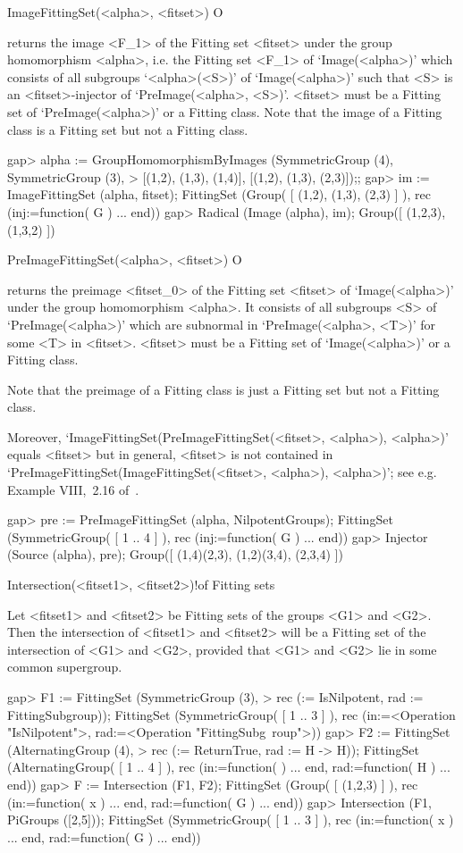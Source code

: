 \>ImageFittingSet(<alpha>, <fitset>) O

returns the image <F_1> of the Fitting set <fitset> under the group homomorphism 
<alpha>, i.e.
the Fitting set <F_1> of `Image(<alpha>)' which consists of all subgroups
`<alpha>(<S>)' of `Image(<alpha>)' such that <S> is an <fitset>-injector of 
`PreImage(<alpha>, <S>)'. <fitset> must be a Fitting set of `PreImage(<alpha>)'
or a Fitting class.  Note that the image of a Fitting class is a
Fitting set but not a Fitting class.

\beginexample
gap> alpha := GroupHomomorphismByImages (SymmetricGroup (4), SymmetricGroup (3),
>  [(1,2), (1,3), (1,4)], [(1,2), (1,3), (2,3)]);;
gap> im := ImageFittingSet (alpha, fitset);
FittingSet (Group( [ (1,2), (1,3), (2,3) 
 ] ), rec (inj:=function( G ) ... end))
gap> Radical (Image (alpha), im);
Group([ (1,2,3), (1,3,2) ])
\endexample

\>PreImageFittingSet(<alpha>, <fitset>) O

returns the preimage <fitset_0> of the Fitting set <fitset> of `Image(<alpha>)' under the group homomorphism <alpha>. It consists of all
subgroups <S> of `PreImage(<alpha>)' which are subnormal in `PreImage(<alpha>, <T>)' for some <T> in <fitset>. <fitset> must be a Fitting set of
`Image(<alpha>)' or a Fitting class. 

Note that the preimage of a Fitting class is just a Fitting set but 
not a Fitting class.

Moreover, `ImageFittingSet(PreImageFittingSet(<fitset>, <alpha>),
<alpha>)' equals <fitset> but in general, <fitset> is not contained in
`PreImageFittingSet(ImageFittingSet(<fitset>, <alpha>), <alpha>)'; see
e.g. Example VIII,~2.16 of~\cite{DH1992}.

\beginexample
gap> pre := PreImageFittingSet (alpha, NilpotentGroups);
FittingSet (SymmetricGroup( [ 1 .. 4 ] ), rec (inj:=function( G ) ... end))
gap> Injector (Source (alpha), pre);
Group([ (1,4)(2,3), (1,2)(3,4), (2,3,4) ])
\endexample

\>Intersection(<fitset1>, <fitset2>)!{of Fitting sets}

Let <fitset1> and <fitset2> be Fitting sets of the groups <G1> and <G2>. 
Then the intersection of <fitset1> and <fitset2> will be a Fitting set of the 
intersection of <G1> and <G2>, provided that <G1> and <G2> lie in some 
common supergroup.

\beginexample
gap> F1 := FittingSet (SymmetricGroup (3),
> rec (\in := IsNilpotent, rad := FittingSubgroup));
FittingSet (SymmetricGroup( 
[ 1 .. 3 ] ), rec (in:=<Operation "IsNilpotent">, rad:=<Operation "FittingSubg\
roup">))
gap> F2 := FittingSet (AlternatingGroup (4),
> rec (\in := ReturnTrue, rad := H -> H));
FittingSet (AlternatingGroup( 
[ 1 .. 4 ] ), rec (in:=function(  ) ... end, rad:=function( H ) ... end))
gap> F := Intersection (F1, F2);
FittingSet (Group( 
[ (1,2,3) ] ), rec (in:=function( x ) ... end, rad:=function( G ) ... end))
gap> Intersection (F1, PiGroups ([2,5]));
FittingSet (SymmetricGroup( 
[ 1 .. 3 ] ), rec (in:=function( x ) ... end, rad:=function( G ) ... end))
\endexample


